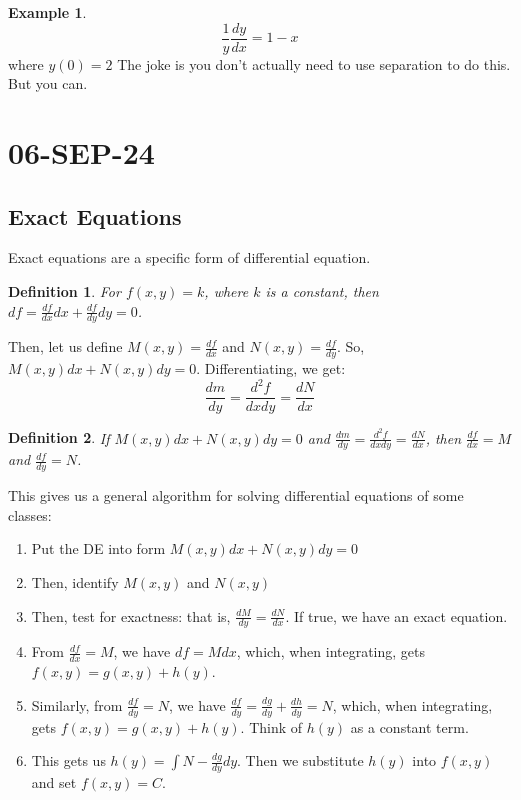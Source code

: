 \documentclass{article}
\newtheorem{defn}{Definition}
\theoremstyle{definition}
\newtheorem{example}{Example}[section]
\begin{document}
\begin{example}
    \[\frac{1}{y}\frac{dy}{dx} = 1-x\]
    where $y(0) = 2$
The joke is you don't actually need to use separation to do this. But you can. 
\end{example}


\section{06-SEP-24}
\subsection{Exact Equations}
Exact equations are a specific form of differential equation. 
\begin{defn}
For $f(x,y) = k$, where $k$ is a constant, then $df = \frac{df}{dx}dx + \frac{df}{dy}dy = 0$.
\end{defn}

Then, let us define $M(x,y) = \frac{df}{dx}$ and $N(x,y) = \frac{df}{dy}$. So, $M(x,y)dx + N(x,y)dy = 0$. 
Differentiating, we get:
\[\frac{dm}{dy} = \frac{d^2f}{dxdy} = \frac{dN}{dx}\]

\begin{defn}
If $M(x,y)dx + N(x,y)dy = 0$ and $\frac{dm}{dy} = \frac{d^2f}{dxdy} = \frac{dN}{dx}$, then $\frac{df}{dx} = M$ and $\frac{df}{dy} = N$.
\end{defn}

This gives us a general algorithm for solving differential equations of some classes: 
\begin{enumerate}
    \item Put the DE into form $M(x,y)dx + N(x,y)dy = 0$
    \item Then, identify $M(x,y)$ and $N(x,y)$
    \item Then, test for exactness: that is, $\frac{dM}{dy} = \frac{dN}{dx}$. If true, we have an exact equation. 
    \item From $\frac{df}{dx} = M$, we have $df = M dx$, which, when integrating, gets $f(x,y) = g(x,y) + h(y)$.
    \item Similarly, from $\frac{df}{dy} = N$, we have $\frac{df}{dy} = \frac{dg}{dy} + \frac{dh}{dy} = N$, which, when integrating, gets $f(x,y) = g(x,y) + h(y)$. Think of $h(y)$ as a constant term.
    \item This gets us $h(y) = \int{N - \frac{dg}{dy}}dy$. Then we substitute $h(y)$ into $f(x,y)$ and set $f(x,y) = C$.
\end{enumerate}
\end{document}

